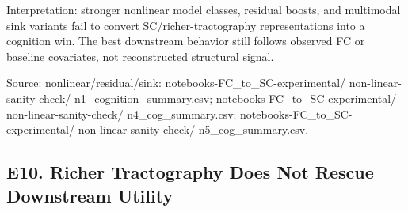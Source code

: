 Interpretation: stronger nonlinear model classes, residual boosts, and multimodal sink variants fail to convert SC/richer-tractography representations into a cognition win. The best downstream behavior still follows observed FC or baseline covariates, not reconstructed structural signal.

Source: nonlinear/residual/sink: notebooks-FC\_to\_SC-experimental/ non-linear-sanity-check/ n1\_cognition\_summary.csv; notebooks-FC\_to\_SC-experimental/ non-linear-sanity-check/ n4\_cog\_summary.csv; notebooks-FC\_to\_SC-experimental/ non-linear-sanity-check/ n5\_cog\_summary.csv.

\subsection{E10. Richer Tractography Does Not Rescue Downstream Utility}\label{e10-richer-tractography-does-not-rescue-downstream-utility}

